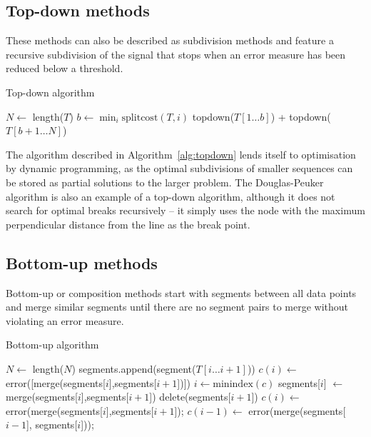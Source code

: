 \subsection{Top-down methods}
These methods can also be described as subdivision methods and feature
a recursive subdivision of the signal that stops when an error measure
has been reduced below a threshold.
\begin{algorithm}
  \caption{Top-down algorithm}
  \label{alg:topdown}
  \begin{algorithmic}
    \Else
      \State $N \gets $ length($T$)
      \State $b \gets \min_i{\mathrm{splitcost}(T,i)}$ 
      \Return topdown($T[1\dots b]$) + topdown($T[b+1\dots N]$) 
    \EndIf
    \EndFunction
\end{algorithmic}
\end{algorithm}
The algorithm described in Algorithm~\ref{alg:topdown} lends itself to
optimisation by dynamic programming, as the optimal subdivisions of
smaller sequences can be stored as partial solutions to the larger
problem.  The Douglas-Peuker algorithm \citep{douglas_algorithms_1973}
is also an example of a top-down algorithm, although it does not
search for optimal breaks recursively -- it simply uses the node with
the maximum perpendicular distance from the line as the break point.

\subsection{Bottom-up methods}
Bottom-up or composition methods start with segments between
all data points and merge similar segments until there are no segment
pairs to merge without violating an error measure.

\begin{algorithm}
  \caption{Bottom-up algorithm}
  \label{alg:bottomup}
  \begin{algorithmic}
    \State $N \gets $ length($N$)
     
    \State segments.append(segment($T[i\dots i+1]$))
    \EndFor
     
    \State $c(i) \gets $error([merge(segments[$i$],segments[$i+1$])])
    \EndFor
    \State $i \gets \mathrm{minindex}(c)$ 
    \State segments[$i$] $\gets$ merge(segments[$i$],segments[$i+1$]) 
    \State delete(segments[$i+1$]) 
    \State $c(i) \gets $error(merge(segments[$i$],segments[$i+1$]); 
    \State $c(i-1) \gets $ error(merge(segments[$i-1$], segments[$i$])); 
    \EndWhile
    \EndFunction
  \end{algorithmic}
\end{algorithm}


